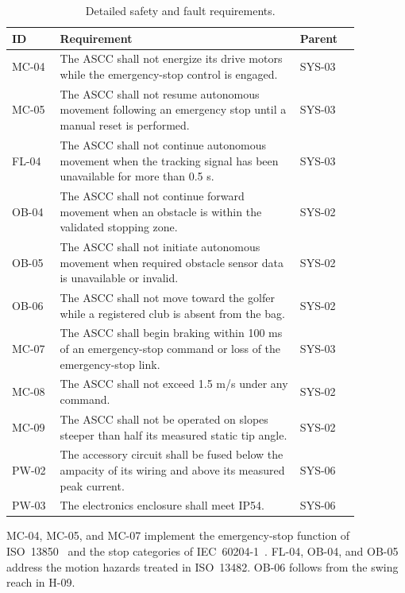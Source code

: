 \begin{table}[H]
\centering
\caption{Detailed safety and fault requirements.}
\label{tab:app-safety}
\footnotesize
\begin{tabular}{p{0.12\linewidth} p{0.60\linewidth} p{0.15\linewidth}}
\hline
\textbf{ID} & \textbf{Requirement} & \textbf{Parent} \\
\hline
MC-04 & The ASCC shall not energize its drive motors while the emergency-stop control is engaged. & SYS-03 \\
MC-05 & The ASCC shall not resume autonomous movement following an emergency stop until a manual reset is performed. & SYS-03 \\
FL-04 & The ASCC shall not continue autonomous movement when the tracking signal has been unavailable for more than 0.5 s. & SYS-03 \\
OB-04 & The ASCC shall not continue forward movement when an obstacle is within the validated stopping zone. & SYS-02 \\
OB-05 & The ASCC shall not initiate autonomous movement when required obstacle sensor data is unavailable or invalid. & SYS-02 \\
OB-06 & The ASCC shall not move toward the golfer while a registered club is absent from the bag. & SYS-02 \\
MC-07 & The ASCC shall begin braking within 100 ms of an emergency-stop command or loss of the emergency-stop link. & SYS-03 \\
MC-08 & The ASCC shall not exceed 1.5 m/s under any command. & SYS-02 \\
MC-09 & The ASCC shall not be operated on slopes steeper than half its measured static tip angle. & SYS-02 \\
PW-02 & The accessory circuit shall be fused below the ampacity of its wiring and above its measured peak current. & SYS-06 \\
PW-03 & The electronics enclosure shall meet IP54. & SYS-06 \\
\hline
\end{tabular}
\end{table}

MC-04, MC-05, and MC-07 implement the emergency-stop function of ISO~13850~\cite{iso13850} and the stop categories of IEC~60204-1~\cite{iec60204-1}. FL-04, OB-04, and OB-05 address the motion hazards treated in ISO~13482. OB-06 follows from the swing reach in H-09.





